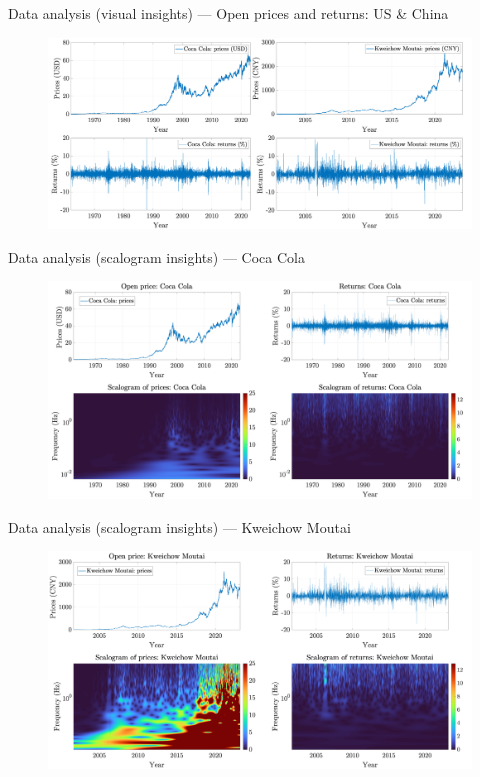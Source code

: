 \documentclass[11pt, aspectratio= 169]{beamer}
\begin{document}
	\begin{frame}{Data analysis (visual insights) --- Open prices and returns: US \& China}
		\begin{figure}[H]
			\includegraphics[width= 14cm]{visual_insight.png}
		\end{figure}
	\end{frame}

	\begin{frame}{Data analysis (scalogram insights) --- Coca Cola}
		\begin{figure}[H]
			\includegraphics[width= 14cm]{scalogram_insights_us.png}
		\end{figure}
	\end{frame}

	\begin{frame}{Data analysis (scalogram insights) --- Kweichow Moutai}
		\begin{figure}[H]
			\includegraphics[width= 14cm]{scalogram_insights_china.png}
		\end{figure}
	\end{frame}
\end{document}

